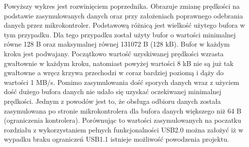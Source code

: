 \documentclass{BscUS}
\begin{document}
\noindent Powyższy wykres jest rozwinięciem poprzednika. Obrazuje zmianę prędkości na podstawie zasymulowanych danych oraz przy założeniach poprawnego odebrania danych przez mikrokontroler. Podstawową różnicą jest wielkość użytego bufora w tym przypadku. Dla tego przypadku został użyty bufor o wartości minimalnej równe 128 B oraz maksymalnej równej 131072 B (128 kB). Bufor w każdym kroku jest podwajany. Początkowo wartość uzyskiwanej prędkości wzrasta gwałtownie w każdym kroku, natomiast powyżej wartości 8 kB nie są już tak gwałtowne a wręcz krzywa przechodzi w coraz bardziej poziomą i dąży do wartości 1 MB/s. 
\newline
\indent Pomimo zasymulowania dość sporych danych wraz z użyciem dość dużego bufora danych nie udało się uzyskać oczekiwanej minimalnej prędkości. Jednym z powodów jest to, że obsługa odbioru danych została zasymulowana po stronie mikrokontrolera dla bufora danych większego niż 64 B (ograniczenia kontrolera). Porównując to wartości zasymulowanych na poczatku rozdziału z wykorzystaniem pełnych funkcjonalności USB2.0 można założyć iż w wypadku braku ograniczeń USB1.1 istnieje możliwość powodzenia projektu.
\end{document}

